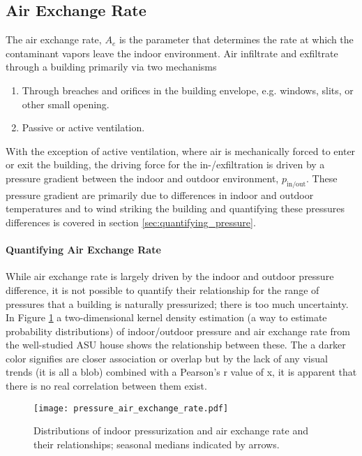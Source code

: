 \subsection{Air Exchange Rate}

The air exchange rate, $A_e$ is the parameter that determines the rate at which the contaminant vapors leave the indoor environment.
Air infiltrate and exfiltrate through a building primarily via two mechanisms
\begin{enumerate}
  \item Through breaches and orifices in the building envelope, e.g. windows, slits, or other small opening.
  \item Passive or active ventilation.
\end{enumerate}
With the exception of active ventilation, where air is mechanically forced to enter or exit the building, the driving force for the in-/exfiltration is driven by a pressure gradient between the indoor and outdoor environment, $p_\mathrm{in/out}$.
These pressure gradient are primarily due to differences in indoor and outdoor temperatures and to wind striking the building and quantifying these pressures differences is covered in section \ref{sec:quantifying_pressure}.\par

\paragraph{Quantifying Air Exchange Rate}

While air exchange rate is largely driven by the indoor and outdoor pressure difference, it is not possible to quantify their relationship for the range of pressures that a building is naturally pressurized; there is too much uncertainty.
In Figure \ref{fig:pressure_air_exchange_rate_kde} a two-dimensional kernel density estimation (a way to estimate probability distributions\cite{altman_introduction_1992}) of indoor/outdoor pressure and air exchange rate from the well-studied ASU house shows the relationship between these\cite{guo_identification_2015}.
The a darker color signifies are closer association or overlap but by the lack of any visual trends (it is all a blob) combined with a Pearson's r value of x, it is apparent that there is no real correlation between them exist.\par

\begin{figure}[htb!]
  \texttt{[image: pressure\_air\_exchange\_rate.pdf]}
  \caption{Distributions of indoor pressurization and air exchange rate and their relationships; seasonal medians indicated by arrows.}
  \label{fig:pressure_air_exchange_rate_kde}
\end{figure}

